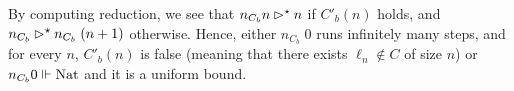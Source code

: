 \documentclass[a4paper,UKenglish,cleveref, autoref, thm-restate]{lipics-v2021}
\newlength{\mysep}
\newlength{\myl}
\newcommand{\twoelt}[2]{
  \settowidth{\myl}{$#1$}
  \setlength{\mysep}{0.5\textwidth}
  \addtolength{\mysep}{-\myl}
  \addtolength{\mysep}{-15pt}
\[
  #1
  \hspace{\mysep}
  #2
\]
}
\begin{document}
\begin{remark}\label{rmk:termin_FT}
  By computing reduction, we see that $n_{C_b} n \rhd^{\star} n$ if $C'_b(n)$ holds, and $n_{C_b} \rhd^{\star} n_{C_b}\;(n+1)$ otherwise.
  Hence, either $n_{C_b}\;0$ runs infinitely many steps, and for every $n$, $C'_b(n)$ is false (meaning that there exists $\ell_n \notin C$ of size $n$) or $n_{C_b} 0 \Vdash \mathrm{Nat}$ and it is a uniform bound.
\end{remark}

%
%
%
%
%
%
\end{document}
